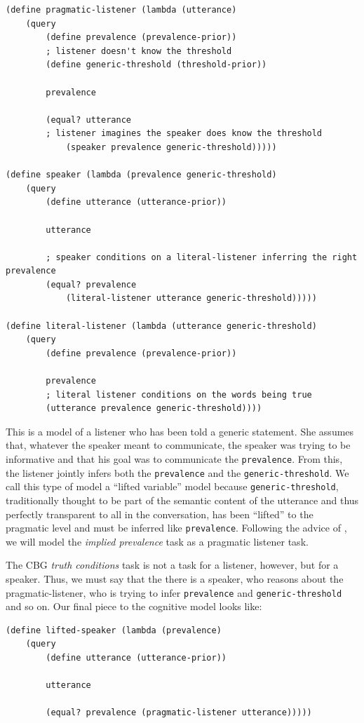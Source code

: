 \documentclass[10pt,letterpaper]{article}
\begin{document}
\begin{lstlisting}
(define pragmatic-listener (lambda (utterance)
	(query
		(define prevalence (prevalence-prior))
		; listener doesn't know the threshold
		(define generic-threshold (threshold-prior))
			
		prevalence
			
		(equal? utterance 
		; listener imagines the speaker does know the threshold
			(speaker prevalence generic-threshold)))))
			
(define speaker (lambda (prevalence generic-threshold)
	(query
		(define utterance (utterance-prior))
			
		utterance
			
		; speaker conditions on a literal-listener inferring the right prevalence
		(equal? prevalence 
			(literal-listener utterance generic-threshold)))))
			
(define literal-listener (lambda (utterance generic-threshold)
	(query
		(define prevalence (prevalence-prior))
			
		prevalence
		; literal listener conditions on the words being true
		(utterance prevalence generic-threshold))))
\end{lstlisting}

This is a model of a listener who has been told a generic statement. She assumes that, whatever the speaker meant to communicate, the speaker was trying to be informative and that his goal was to communicate the \lstinline{prevalence}. From this, the listener jointly infers both the \lstinline{prevalence} and the \lstinline{generic-threshold}. We call this type of model a ``lifted variable'' model because \lstinline{generic-threshold}, traditionally thought to be part of the semantic content of the utterance and thus perfectly transparent to all in the conversation, has been ``lifted'' to the pragmatic level and must be inferred like \lstinline{prevalence}. Following the advice of , we will model the \emph{implied prevalence} task as a pragmatic listener task.  

The CBG \emph{truth conditions} task is not a task for a listener, however, but for a speaker. Thus, we must say that the there is a speaker, who reasons about the pragmatic-listener, who is trying to infer \lstinline{prevalence} and \lstinline{generic-threshold} and so on. Our final piece to the cognitive model looks like:

\begin{lstlisting}
(define lifted-speaker (lambda (prevalence)
	(query
		(define utterance (utterance-prior))
			
		utterance
			
		(equal? prevalence (pragmatic-listener utterance)))))	
\end{lstlisting}
\end{document}
